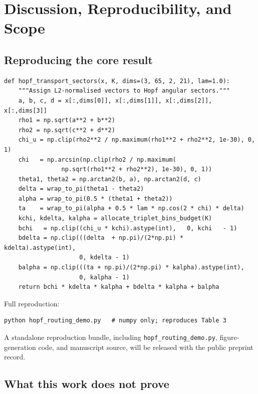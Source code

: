 \documentclass[11pt]{article}
\begin{document}
\section{Discussion, Reproducibility, and Scope}

\subsection{Reproducing the core result}

\begin{lstlisting}[caption={Core routing function (numpy only, $<60$~s to reproduce Table~\ref{tab:scaling}).},
                   label={lst:routing}]
def hopf_transport_sectors(x, K, dims=(3, 65, 2, 21), lam=1.0):
    """Assign L2-normalised vectors to Hopf angular sectors."""
    a, b, c, d = x[:,dims[0]], x[:,dims[1]], x[:,dims[2]], x[:,dims[3]]
    rho1 = np.sqrt(a**2 + b**2)
    rho2 = np.sqrt(c**2 + d**2)
    chi_u = np.clip(rho2**2 / np.maximum(rho1**2 + rho2**2, 1e-30), 0, 1)
    chi   = np.arcsin(np.clip(rho2 / np.maximum(
                np.sqrt(rho1**2 + rho2**2), 1e-30), 0, 1))
    theta1, theta2 = np.arctan2(b, a), np.arctan2(d, c)
    delta = wrap_to_pi(theta1 - theta2)
    alpha = wrap_to_pi(0.5 * (theta1 + theta2))
    ta    = wrap_to_pi(alpha + 0.5 * lam * np.cos(2 * chi) * delta)
    kchi, kdelta, kalpha = allocate_triplet_bins_budget(K)
    bchi   = np.clip((chi_u * kchi).astype(int),   0, kchi   - 1)
    bdelta = np.clip(((delta  + np.pi)/(2*np.pi) * kdelta).astype(int),
                     0, kdelta - 1)
    balpha = np.clip(((ta + np.pi)/(2*np.pi) * kalpha).astype(int),
                     0, kalpha - 1)
    return bchi * kdelta * kalpha + bdelta * kalpha + balpha
\end{lstlisting}

Full reproduction:
\begin{verbatim}
python hopf_routing_demo.py   # numpy only; reproduces Table 3
\end{verbatim}

A standalone reproduction bundle, including \texttt{hopf\_routing\_demo.py},
figure-generation code, and manuscript source, will be released with the public
preprint record.

\subsection{What this work does not prove}
\end{document}
